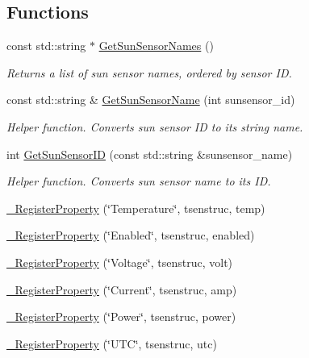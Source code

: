 \subsection*{Functions}
\begin{DoxyCompactItemize}
\item 
const std\+::string $\ast$ \hyperlink{namespacecubesat_a918ca5531916495b225cc1ae5663a794}{Get\+Sun\+Sensor\+Names} ()
\begin{DoxyCompactList}\small\item\em Returns a list of sun sensor names, ordered by sensor ID. \end{DoxyCompactList}\item 
const std\+::string \& \hyperlink{namespacecubesat_af98c0f45932dc066e264459dd9aed5f2}{Get\+Sun\+Sensor\+Name} (int sunsensor\+\_\+id)
\begin{DoxyCompactList}\small\item\em Helper function. Converts sun sensor ID to its string name. \end{DoxyCompactList}\item 
int \hyperlink{namespacecubesat_a3d30cc7e0aa699067b162ab714873f97}{Get\+Sun\+Sensor\+ID} (const std\+::string \&sunsensor\+\_\+name)
\begin{DoxyCompactList}\small\item\em Helper function. Converts sun sensor name to its ID. \end{DoxyCompactList}\item 
\hyperlink{namespacecubesat_ae60badb52b7fcfff832fba5f59a3d36f}{\+\_\+\+Register\+Property} (\char`\"{}Temperature\char`\"{}, tsenstruc, temp)
\item 
\hyperlink{namespacecubesat_a5655beb2324dcdf96e70a3f912e75e7f}{\+\_\+\+Register\+Property} (\char`\"{}Enabled\char`\"{}, tsenstruc, enabled)
\item 
\hyperlink{namespacecubesat_ad118b4edea35ff959ec0d700404120fa}{\+\_\+\+Register\+Property} (\char`\"{}Voltage\char`\"{}, tsenstruc, volt)
\item 
\hyperlink{namespacecubesat_a5a9fca0b9cf3936f3a62d27e3da35d89}{\+\_\+\+Register\+Property} (\char`\"{}Current\char`\"{}, tsenstruc, amp)
\item 
\hyperlink{namespacecubesat_af5b3b935beae2161e395e8ddb9ea6420}{\+\_\+\+Register\+Property} (\char`\"{}Power\char`\"{}, tsenstruc, power)
\item 
\hyperlink{namespacecubesat_a71447aabcce7c231bbd9a13860c5dcc6}{\+\_\+\+Register\+Property} (\char`\"{}U\+TC\char`\"{}, tsenstruc, utc)
\item 

\end{DoxyCompactItemize}
